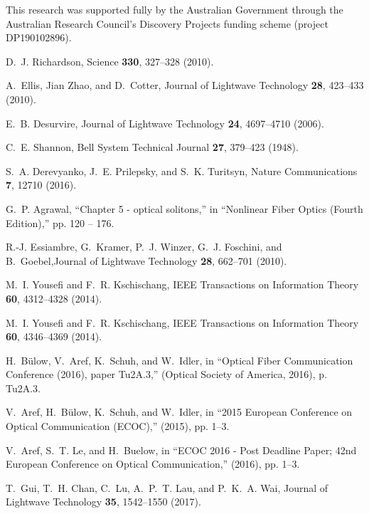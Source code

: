 \documentclass[9pt,twocolumn,twoside]{osajnl}
\begin{document}
This research was supported fully by the Australian Government through the Australian Research Council's Discovery Projects funding scheme (project DP190102896).

\begin{thebibliography}{10}
\newcommand{\enquote}[1]{``#1''}
D.~J. Richardson, Science \textbf{330}, 327--328 (2010).

A.~Ellis, {Jian Zhao}, and D.~Cotter, Journal of Lightwave Technology \textbf{28}, 423--433 (2010).

E.~B. Desurvire, Journal of Lightwave Technology \textbf{24}, 4697--4710 (2006).

C.~E. Shannon, Bell System Technical Journal \textbf{27}, 379--423 (1948).

S.~A. Derevyanko, J.~E. Prilepsky, and S.~K. Turitsyn, Nature Communications \textbf{7}, 12710 (2016).

G.~P. Agrawal, \enquote{Chapter 5 - optical solitons,} in \enquote{Nonlinear
  Fiber Optics (Fourth Edition),} pp. 120 -- 176.

R.-J. Essiambre, G.~Kramer, P.~J. Winzer, G.~J. Foschini, and B.~Goebel,Journal of Lightwave Technology \textbf{28}, 662--701 (2010).

M.~I. Yousefi and F.~R. Kschischang, IEEE Transactions on Information Theory \textbf{60}, 4312--4328
  (2014).

M.~I. Yousefi and F.~R. Kschischang, IEEE Transactions on Information Theory \textbf{60},
  4346--4369 (2014).

H.~Bülow, V.~Aref, K.~Schuh, and W.~Idler, in \enquote{Optical {Fiber} {Communication} {Conference} (2016),
  paper {Tu}2A.3,}  (Optical Society of America, 2016), p. Tu2A.3.

V.~Aref, H.~Bülow, K.~Schuh, and W.~Idler, in \enquote{2015 {European} {Conference} on {Optical} {Communication} ({ECOC}),} (2015), pp. 1--3.

V.~Aref, S.~T. Le, and H.~Buelow, in \enquote{{ECOC} 2016 - {Post} {Deadline} {Paper}; 42nd {European} {Conference} on {Optical} {Communication},} (2016), pp. 1--3.

T.~Gui, T.~H. Chan, C.~Lu, A.~P.~T. Lau, and P.~K.~A. Wai, Journal of Lightwave Technology \textbf{35}, 1542--1550 (2017).


\end{thebibliography}
\end{document}
